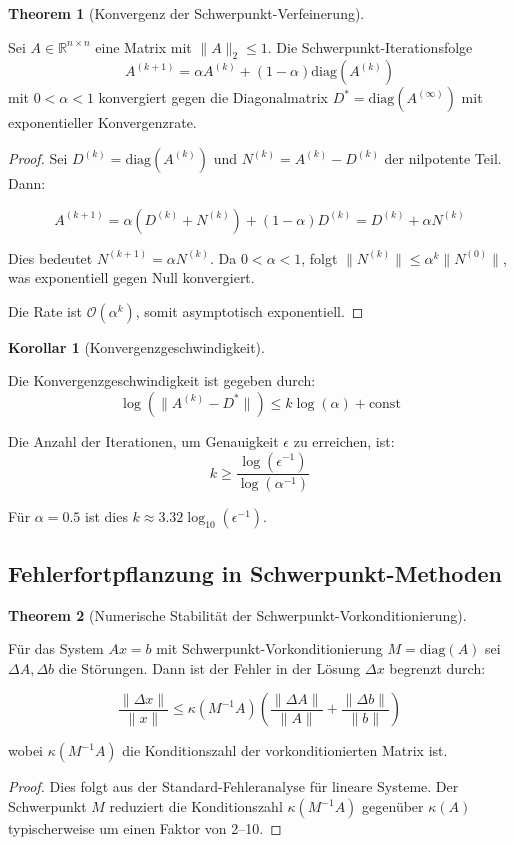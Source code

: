 \documentclass[a4paper,12pt]{article}
\theoremstyle{definition}
\newtheorem{corollary}{Korollar}
\newtheorem{theorem}{Theorem}
\begin{document}
\begin{theorem}[Konvergenz der Schwerpunkt-Verfeinerung]
\label{thm:konvergenz_schwerpunkt_verfeinerung}

Sei $A \in \mathbb{R}^{n \times n}$ eine Matrix mit $\|A\|_2 \leq 1$. Die Schwerpunkt-Iterationsfolge
\[
A^{(k+1)} = \alpha A^{(k)} + (1-\alpha) \text{diag}(A^{(k)})
\]
mit $0 < \alpha < 1$ konvergiert gegen die Diagonalmatrix $D^* = \text{diag}(A^{(\infty)})$ mit exponentieller Konvergenzrate.

\begin{proof}
Sei $D^{(k)} = \text{diag}(A^{(k)})$ und $N^{(k)} = A^{(k)} - D^{(k)}$ der nilpotente Teil. Dann:

\[
A^{(k+1)} = \alpha(D^{(k)} + N^{(k)}) + (1-\alpha) D^{(k)} = D^{(k)} + \alpha N^{(k)}
\]

Dies bedeutet $N^{(k+1)} = \alpha N^{(k)}$. Da $0 < \alpha < 1$, folgt $\|N^{(k)}\| \leq \alpha^k \|N^{(0)}\|$, was exponentiell gegen Null konvergiert.

Die Rate ist $\mathcal{O}(\alpha^k)$, somit asymptotisch exponentiell.
\end{proof}
\end{theorem}

\begin{corollary}[Konvergenzgeschwindigkeit]
\label{cor:konvergenz_geschwindigkeit}

Die Konvergenzgeschwindigkeit ist gegeben durch:
\[
\log(\|A^{(k)} - D^*\|) \leq k \log(\alpha) + \text{const}
\]

Die Anzahl der Iterationen, um Genauigkeit $\epsilon$ zu erreichen, ist:
\[
k \geq \frac{\log(\epsilon^{-1})}{\log(\alpha^{-1})}
\]

Für $\alpha = 0.5$ ist dies $k \approx 3.32 \log_{10}(\epsilon^{-1})$.
\end{corollary}

\subsection{Fehlerfortpflanzung in Schwerpunkt-Methoden}

\begin{theorem}[Numerische Stabilität der Schwerpunkt-Vorkonditionierung]
\label{thm:numerische_stabilitaet}

Für das System $Ax = b$ mit Schwerpunkt-Vorkonditionierung $M = \text{diag}(A)$ sei $\Delta A, \Delta b$ die Störungen. Dann ist der Fehler in der Lösung $\Delta x$ begrenzt durch:

\[
\frac{\|\Delta x\|}{\|x\|} \leq \kappa(M^{-1}A) \left( \frac{\|\Delta A\|}{\|A\|} + \frac{\|\Delta b\|}{\|b\|} \right)
\]

wobei $\kappa(M^{-1}A)$ die Konditionszahl der vorkonditionierten Matrix ist.

\begin{proof}
Dies folgt aus der Standard-Fehleranalyse für lineare Systeme. Der Schwerpunkt $M$ reduziert die Konditionszahl $\kappa(M^{-1}A)$ gegenüber $\kappa(A)$ typischerweise um einen Faktor von 2--10.
\end{proof}
\end{theorem}
\end{document}
